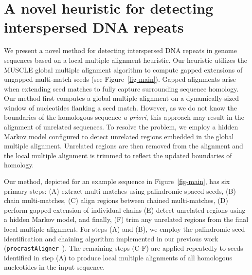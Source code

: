 \documentclass[12pt,journal,letterpaper,onecolumn, draftcls]{IEEEtran}
\begin{document}
\section{A novel heuristic for detecting interspersed DNA repeats}
\label{section-main}
We present a novel method for detecting interspersed DNA repeats in genome sequences based on a local multiple alignment heuristic. Our heuristic utilizes the MUSCLE
global multiple alignment algorithm to compute gapped extensions of ungapped
multi-match seeds (see Figure~\ref{fig-main}). Gapped alignments arise
when extending seed matches to fully capture surrounding sequence
homology. Our method first computes a
global multiple alignment on a dynamically-sized window of nucleotides
flanking a seed match.  However, as we do not know the boundaries of the
homologous sequence \textit{a priori}, this approach may result in the
alignment of unrelated sequences.  To resolve the problem, we employ a hidden Markov model configured to detect
unrelated regions embedded in the global multiple alignment.
Unrelated regions are then removed from the alignment and the
local multiple alignment is trimmed to reflect the updated boundaries
of homology.

Our method, depicted for an example sequence in
Figure~\ref{fig-main}, has six primary steps: (A) extract multi-matches using
palindromic spaced seeds, (B) chain
multi-matches, (C) align regions between chained multi-matches, (D)
perform gapped extension of individual chains (E) detect unrelated regions
using a hidden Markov model, and finally, (F) trim any unrelated regions from
the final local multiple alignment. For steps (A) and (B), we employ the palindromic seed identification
and chaining algorithm implemented in our previous work (\texttt{procrastAligner}~\cite{ref-procrast}). The remaining steps (C-F) are applied
repeatedly to seeds identified in step (A) to produce local multiple
alignments of all homologous nucleotides in the input sequence.
\end{document}
